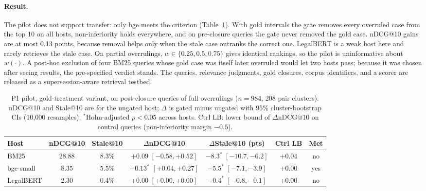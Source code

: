 \paragraph{Result.}
The pilot does not support transfer: only bge meets the criterion (Table~\ref{tab:p1_pilot}).
With gold intervals the gate removes every overruled case from the top 10 on all hosts, non-inferiority holds everywhere, and on pre-closure queries the gate never removed the gold case.
nDCG@10 gains are at most 0.13 points, because removal helps only when the stale case outranks the correct one.
LegalBERT is a weak host here and rarely retrieves the stale case.
On partial overrulings, $w \in \{0.25, 0.5, 0.75\}$ gives identical rankings, so the pilot is uninformative about $w(\cdot)$.
A post-hoc exclusion of four BM25 queries whose gold case was itself later overruled would let two hosts pass; because it was chosen after seeing results, the pre-specified verdict stands.
The queries, relevance judgments, gold closures, corpus identifiers, and a scorer are released as a supersession-aware retrieval testbed.

\begin{table}[t]
\centering
\small
\setlength{\tabcolsep}{5pt}
\begin{adjustbox}{max width=\textwidth}
\begin{tabular}{lcccccc}
\toprule
Host & nDCG@10 & Stale@10 & $\Delta$nDCG@10 & $\Delta$Stale@10 (pts) & Ctrl LB & Met \\
\midrule
BM25 & 28.88 & 8.3\% & $+0.09$ $[-0.58, +0.52]$ & $-8.3^{*}$ $[-10.7, -6.2]$ & $+0.04$ & no \\
bge-small & 8.35 & 5.5\% & $+0.13^{*}$ $[+0.04, +0.27]$ & $-5.5^{*}$ $[-7.1, -3.9]$ & $+0.00$ & yes \\
LegalBERT & 2.30 & 0.4\% & $+0.00$ $[+0.00, +0.00]$ & $-0.4^{*}$ $[-0.8, -0.1]$ & $+0.00$ & no \\
\bottomrule
\end{tabular}
\end{adjustbox}
\caption{P1 pilot, gold-treatment variant, on post-closure queries of full overrulings ($n = 984$, 208 pair clusters). nDCG@10 and Stale@10 are for the ungated host; $\Delta$ is gated minus ungated with 95\% cluster-bootstrap CIs (10{,}000 resamples); $^{*}$Holm-adjusted $p < 0.05$ across hosts. Ctrl LB: lower bound of $\Delta$nDCG@10 on control queries (non-inferiority margin $-0.5$).}
\label{tab:p1_pilot}
\end{table}

